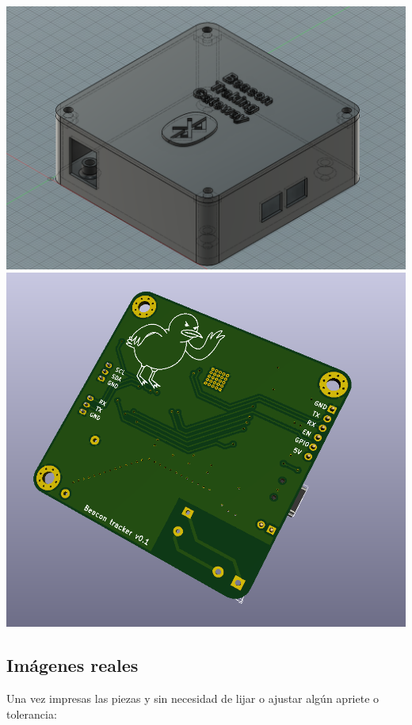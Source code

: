 \documentclass[a4paper ,12pt, onecolumn]{article}
\begin{document}
        \includegraphics[scale=0.1]{../mechanical_master.PNG}
        \includegraphics[scale=0.1]{../receiver_2.PNG}
    \subsection{Imágenes reales}
        Una vez impresas las piezas y sin necesidad de lijar o ajustar algún apriete o tolerancia:
    
\end{document}

